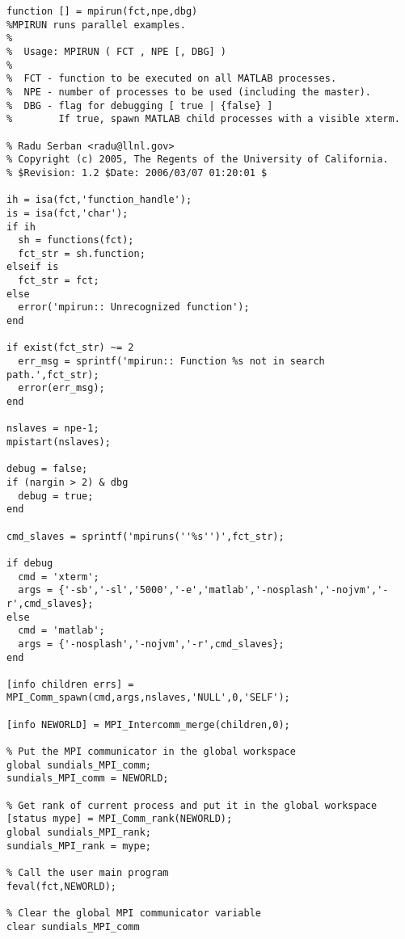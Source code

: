 \begin{lstlisting}[linerange={1-1,10-68}]
function [] = mpirun(fct,npe,dbg)
%MPIRUN runs parallel examples.
%
%  Usage: MPIRUN ( FCT , NPE [, DBG] )
%
%  FCT - function to be executed on all MATLAB processes.
%  NPE - number of processes to be used (including the master).
%  DBG - flag for debugging [ true | {false} ]
%        If true, spawn MATLAB child processes with a visible xterm.

% Radu Serban <radu@llnl.gov>
% Copyright (c) 2005, The Regents of the University of California.
% $Revision: 1.2 $Date: 2006/03/07 01:20:01 $

ih = isa(fct,'function_handle');
is = isa(fct,'char');
if ih
  sh = functions(fct);
  fct_str = sh.function;
elseif is
  fct_str = fct;
else
  error('mpirun:: Unrecognized function');
end

if exist(fct_str) ~= 2
  err_msg = sprintf('mpirun:: Function %s not in search path.',fct_str);
  error(err_msg);
end
  
nslaves = npe-1;
mpistart(nslaves);

debug = false;
if (nargin > 2) & dbg
  debug = true;
end

cmd_slaves = sprintf('mpiruns(''%s'')',fct_str);

if debug
  cmd = 'xterm';
  args = {'-sb','-sl','5000','-e','matlab','-nosplash','-nojvm','-r',cmd_slaves};
else
  cmd = 'matlab';
  args = {'-nosplash','-nojvm','-r',cmd_slaves};
end

[info children errs] = MPI_Comm_spawn(cmd,args,nslaves,'NULL',0,'SELF');

[info NEWORLD] = MPI_Intercomm_merge(children,0);

% Put the MPI communicator in the global workspace
global sundials_MPI_comm;
sundials_MPI_comm = NEWORLD;

% Get rank of current process and put it in the global workspace
[status mype] = MPI_Comm_rank(NEWORLD);
global sundials_MPI_rank;
sundials_MPI_rank = mype;

% Call the user main program
feval(fct,NEWORLD);

% Clear the global MPI communicator variable
clear sundials_MPI_comm

\end{lstlisting}
